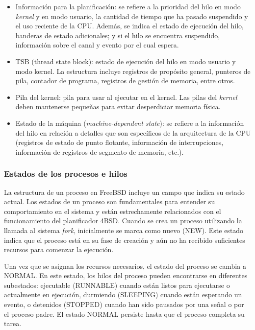 \begin{itemize}
    \item Información para la planificación: se refiere a la prioridad del hilo en modo \textit{kernel} y en modo usuario, la cantidad de tiempo que ha pasado suspendido y el uso reciente de la CPU. Además, se indica el estado de ejecución del hilo, banderas de estado adicionales; y si el hilo se encuentra suspendido, información sobre el canal y evento por el cual espera.
    \item TSB (thread state block): estado de ejecución del hilo en modo usuario y modo kernel. La estructura incluye registros de propósito general, punteros de pila, contador de programa, registros de gestión de memoria, entre otros.
    \item Pila del kernel: pila para usar al ejecutar en el kernel. Las pilas del \textit{kernel} deben mantenerse pequeñas para evitar desperdiciar memoria física.
    \item Estado de la máquina (\textit{machine-dependent state}): se refiere a la información del hilo en relación a detalles que son específicos de la arquitectura de la CPU (registros de estado de punto flotante, información de interrupciones, información de registros de segmento de memoria, etc.).
\end{itemize}

\subsubsection{Estados de los procesos e hilos}

La estructura de un proceso en FreeBSD incluye un campo que indica su estado actual. Los estados de un proceso son fundamentales para entender su comportamiento en el sistema y están estrechamente relacionados con el funcionamiento del planificador 4BSD. Cuando se crea un proceso utilizando la llamada al sistema \textit{fork}, inicialmente se marca como nuevo (NEW). Este estado indica que el proceso está en su fase de creación y aún no ha recibido suficientes recursos para comenzar la ejecución.

Una vez que se asignan los recursos necesarios, el estado del proceso se cambia a NORMAL. En este estado, los hilos del proceso pueden encontrarse en diferentes subestados: ejecutable (RUNNABLE) cuando están listos para ejecutarse o actualmente en ejecución, durmiendo (SLEEPING) cuando están esperando un evento, o detenidos (STOPPED) cuando han sido pausados por una señal o por el proceso padre. El estado NORMAL persiste hasta que el proceso completa su tarea.

